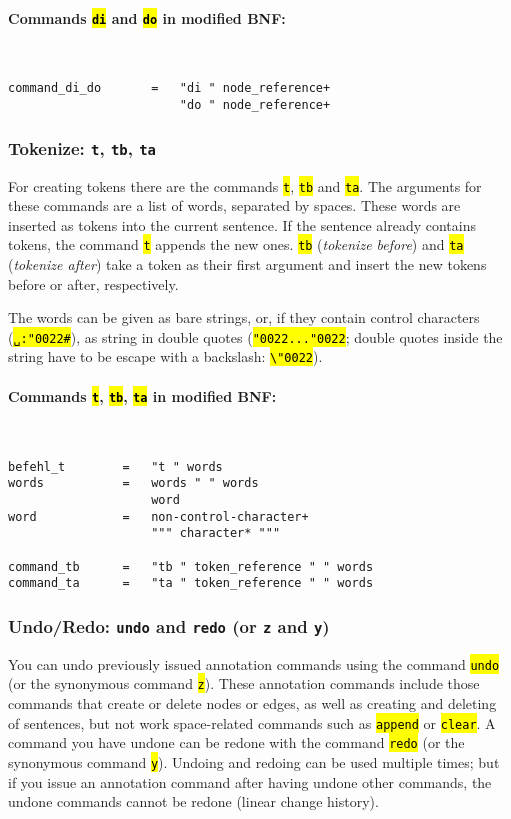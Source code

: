 \documentclass[12pt]{scrartcl}
\newcommand{\quo}{\char"0022}
\newcommand{\code}[1]{\hl{\texttt{#1}}}
\begin{document}
\paragraph*{Commands \code{di} and \code{do} in modified BNF:}
~
\begin{lstlisting}
command_di_do       =   "di " node_reference+
                        "do " node_reference+
\end{lstlisting}


\subsubsection{Tokenize: \texttt{t}, \texttt{tb}, \texttt{ta}}

For creating tokens there are the commands \code{t}, \code{tb} and \code{ta}.
The arguments for these commands are a list of words, separated by spaces.
These words are inserted as tokens into the current sentence.
If the sentence already contains tokens, the command \code{t} appends the new ones.
\code{tb} (\textit{tokenize before}) and \code{ta} (\textit{tokenize after}) take a token as their first argument and insert the new tokens before or after, respectively.

The words can be given as bare strings, or, if they contain control characters (\code{␣:\quo\#}), as string in double quotes (\code{\quo...\quo}; double quotes inside the string have to be escape with a backslash: \code{\textbackslash\quo}).

\paragraph*{Commands \code{t}, \code{tb}, \code{ta} in modified BNF:}
~
\begin{lstlisting}
befehl_t        =   "t " words
words           =   words " " words
                    word
word            =   non-control-character+
                    """ character* """

command_tb      =   "tb " token_reference " " words
command_ta      =   "ta " token_reference " " words
\end{lstlisting}


\subsubsection{Undo/Redo: \texttt{undo} and \texttt{redo} (or \texttt{z} and \texttt{y})}\label{befehl-undo}

You can undo previously issued annotation commands using the command \code{undo} (or the synonymous command \code{z}).
These annotation commands include those commands that create or delete nodes or edges, as well as creating and deleting of sentences, but not work space-related commands such as \code{append} or \code{clear}.
A command you have undone can be redone with the command \code{redo} (or the synonymous command \code{y}).
Undoing and redoing can be used multiple times; but if you issue an annotation command after having undone other commands, the undone commands cannot be redone (linear change history).
\end{document}
